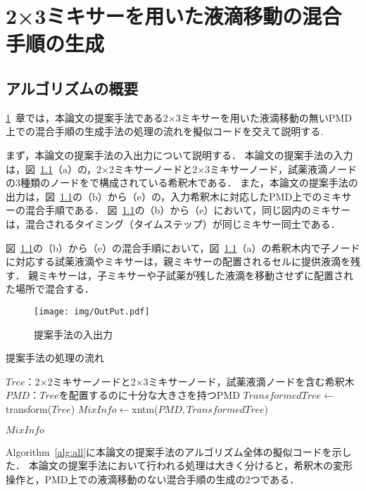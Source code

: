 \chapter{{2×3ミキサーを用いた液滴移動の混合手順の生成}}
\label{proposed}
\section{アルゴリズムの概要}
\ref{proposed}~章では，本論文の提案手法である2$\times$3ミキサーを用いた液滴移動の無いPMD上での混合手順の生成手法の処理の流れを擬似コードを交えて説明する.


まず，本論文の提案手法の入出力について説明する．
本論文の提案手法の入力は，図~\ref{fig:inputoutput}（a）の，2$\times$2ミキサーノードと2$\times$3ミキサーノード，試薬液滴ノードの3種類のノードをで構成されている希釈木である．
また，本論文の提案手法の出力は，図~\ref{fig:inputoutput}の（b）から（e）の，入力希釈木に対応したPMD上でのミキサーの混合手順である．
図~\ref{fig:inputoutput}の（b）から（e）において，同じ図内のミキサーは，混合されるタイミング（タイムステップ）が同じミキサー同士である．

図~\ref{fig:inputoutput}の（b）から（e）の混合手順において，図~\ref{fig:inputoutput}（a）の希釈木内で子ノードに対応する試薬液滴やミキサーは，親ミキサーの配置されるセルに提供液滴を残す．
親ミキサーは，子ミキサーや子試薬が残した液滴を移動させずに配置された場所で混合する．

\begin{figure}[tbp]
 \centering\texttt{[image: img/OutPut.pdf]}
 \caption{提案手法の入出力}\label{fig:inputoutput}
\end{figure}

\begin{algorithm}[tbp]
 \caption{提案手法の処理の流れ}\label{alg:all}
 \begin{algorithmic}[1]
     \Require $\mathit{Tree}$：2$\times$2ミキサーノードと2$\times$3ミキサーノード，試薬液滴ノードを含む希釈木 
     \Require $\mathit{PMD}$：$\mathit{Tree}$を配置するのに十分な大きさを持つPMD  
     \State $\mathit{TransformedTree} \gets$ transform($Tree$) \label{transform_pseudo}
     \State $\mathit{MixInfo \gets}$xntm($\mathit{PMD,TransformedTree}$)  \label{xntm_pseudo}

      \Return $\mathit{MixInfo}$
 \end{algorithmic}
\end{algorithm}
Algorithm~\ref{alg:all}に本論文の提案手法のアルゴリズム全体の擬似コードを示した．
本論文の提案手法において行われる処理は大きく分けると，希釈木の変形操作と，PMD上での液滴移動のない混合手順の生成の2つである．

